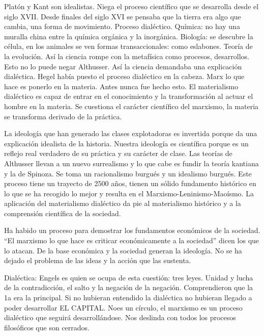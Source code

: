 \documentclass[
  a4paper,
]{article}
\begin{document}
Platón y Kant son idealistas. Niega el proceso científico que se
desarrolla desde el siglo XVII. Desde finales del siglo XVI se pensaba
que la tierra era algo que cambia, una forma de movimiento. Proceso
dialéctico. Química: no hay una muralla china entre la química orgánica
y la inorgánica. Biología: se descubre la célula, en los animales se ven
formas transaccionales: como eslabones. Teoría de la evolución. Así la
ciencia rompe con la metafísica como procesos, desarrollos. Esto no lo
puede negar Althusser. Así la ciencia demandaba una explicación
dialéctica. Hegel había puesto el proceso dialéctico en la cabeza. Marx
lo que hace es ponerlo en la materia. Antes nunca fue hecho esto. El
materialismo dialéctico es capaz de entrar en el conocimiento y la
transformación al actuar el hombre en la materia. Se cuestiona el
carácter científico del marxismo, la materia se transforma derivado de
la práctica.

La ideología que han generado las clases explotadoras es invertida
porque da una explicación idealista de la historia. Nuestra ideología es
científica porque es un reflejo real verdadero de su práctica y su
carácter de clase. Las teorías de Althusser llevan a un nuevo
surrealismo y lo que cabe es fundir la teoría kantiana y la de Spinoza.
Se toma un racionalismo burgués y un idealismo burgués. Este proceso
tiene un trayecto de 2500 años, tienen un sólido fundamento histórico en
lo que se ha recogido lo mejor y resulta en el
Marxismo-Leninismo-Maoísmo. La aplicación del materialismo dialéctico da
pie al materialismo histórico y a la comprensión científica de la
sociedad.

Ha habido un proceso para demostrar los fundamentos económicos de la
sociedad. ``El marxismo lo que hace es criticar económicamente a la
sociedad'' dicen los que lo atacan. De la base económica y la sociedad
generan la ideología. No se ha dejado el problema de las ideas y la
acción que las sustenta.

Dialéctica: Engels es quien se ocupa de esta cuestión: tres leyes.
Unidad y lucha de la contradicción, el salto y la negación de la
negación. Comprendieron que la 1a era la principal. Si no hubieran
entendido la dialéctica no hubieran llegado a poder desarrollar EL
CAPITAL. Noes un círculo, el marxismo es un proceso dialéctico que
seguirá desarrollándose. Nos deslinda con todos los procesos filosóficos
que son cerrados.
\end{document}
